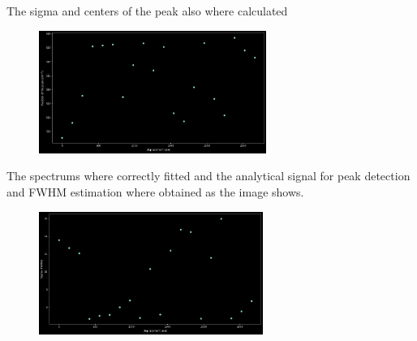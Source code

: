 \documentclass[a4paper,10pt,twocolumn]{article}
\begin{document}
The sigma and centers of the peak also where calculated

\begin{figure}[h]
  \centering
  \includegraphics[width=0.9\columnwidth, height=4cm]{position.png}
\end{figure}


The spectrums where correctly fitted and the analytical signal for peak detection and FWHM estimation where obtained as the image shows.

\begin{figure}[h]
  \centering
  \includegraphics[width=0.9\columnwidth, height=4cm]{sigma.png}
\end{figure}
\end{document}
